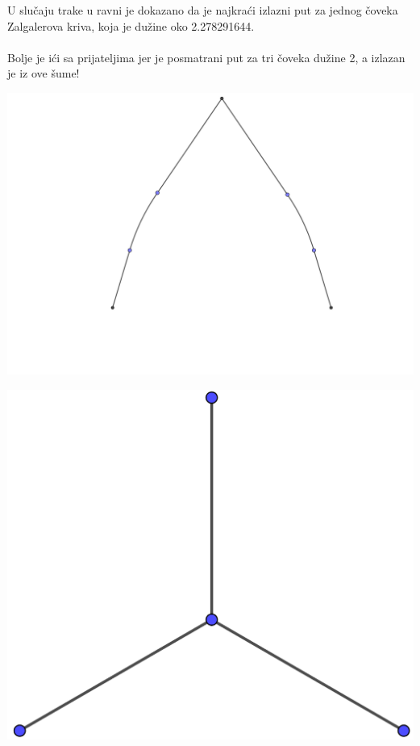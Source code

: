 \documentclass[b1paper,portrait]{template/baposter}
\begin{document}
\begin{poster}
{
	
	\hspace{10pt} U slu\v caju trake u ravni je dokazano da je najkra\' ci izlazni  put za jednog \v coveka Zalgalerova kriva, koja je du\v zine oko 2.278291644. 
	\\ 
	\\
 	\hphantom{sdff}Bolje je i\' ci sa prijateljima jer je posmatrani put za tri \v coveka du\v zine 2, a izlazan je iz ove \v sume!
	\begin{center}
		\begin{minipage}{0.25\linewidth}
			\includegraphics[width=\linewidth]{Zalgaller}
		\end{minipage}
		\hspace{30pt}
		\begin{minipage}{0.25\linewidth}
			\includegraphics[width=\linewidth]{Y}
		\end{minipage}
	\end{center}
	\vspace{0.15cm}
}


\end{poster}
\end{document}
